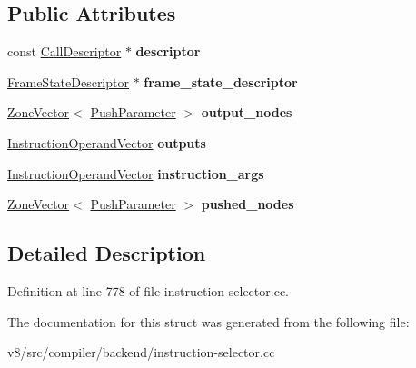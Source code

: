 \subsection*{Public Attributes}
\begin{DoxyCompactItemize}
\item 
\mbox{\label{structv8_1_1internal_1_1compiler_1_1CallBuffer_ac01bec5c0ded21dd536ac3eef10896a4}} 
const \mbox{\hyperlink{classv8_1_1internal_1_1compiler_1_1CallDescriptor}{Call\+Descriptor}} $\ast$ {\bfseries descriptor}
\item 
\mbox{\label{structv8_1_1internal_1_1compiler_1_1CallBuffer_ab49f4b1602a95d0a2bd1bd680dc22bf8}} 
\mbox{\hyperlink{classv8_1_1internal_1_1compiler_1_1FrameStateDescriptor}{Frame\+State\+Descriptor}} $\ast$ {\bfseries frame\+\_\+state\+\_\+descriptor}
\item 
\mbox{\label{structv8_1_1internal_1_1compiler_1_1CallBuffer_a29d79ac2c72550d48e5002f3cf5b2801}} 
\mbox{\hyperlink{classv8_1_1internal_1_1ZoneVector}{Zone\+Vector}}$<$ \mbox{\hyperlink{structv8_1_1internal_1_1compiler_1_1PushParameter}{Push\+Parameter}} $>$ {\bfseries output\+\_\+nodes}
\item 
\mbox{\label{structv8_1_1internal_1_1compiler_1_1CallBuffer_aa7cbccfca0141ad2eaa01d78a1656c76}} 
\mbox{\hyperlink{classv8_1_1internal_1_1ZoneVector}{Instruction\+Operand\+Vector}} {\bfseries outputs}
\item 
\mbox{\label{structv8_1_1internal_1_1compiler_1_1CallBuffer_a9d22523b1d238ca4370ca16d65523a35}} 
\mbox{\hyperlink{classv8_1_1internal_1_1ZoneVector}{Instruction\+Operand\+Vector}} {\bfseries instruction\+\_\+args}
\item 
\mbox{\label{structv8_1_1internal_1_1compiler_1_1CallBuffer_a488391c7beac4435a12deb79cddcd9d9}} 
\mbox{\hyperlink{classv8_1_1internal_1_1ZoneVector}{Zone\+Vector}}$<$ \mbox{\hyperlink{structv8_1_1internal_1_1compiler_1_1PushParameter}{Push\+Parameter}} $>$ {\bfseries pushed\+\_\+nodes}
\end{DoxyCompactItemize}


\subsection{Detailed Description}


Definition at line 778 of file instruction-\/selector.\+cc.



The documentation for this struct was generated from the following file\+:\begin{DoxyCompactItemize}
\item 
v8/src/compiler/backend/instruction-\/selector.\+cc\end{DoxyCompactItemize}

